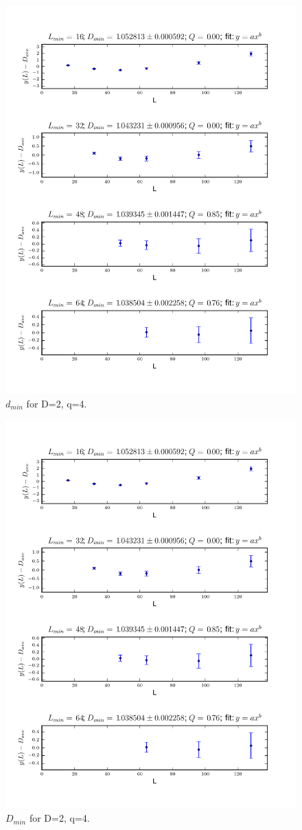\documentclass[pre,preprint]{revtex4}
\begin{document}

\begin{figure}[htp]
\centering
\includegraphics[width=.85\textwidth]{figures/d_min_D2q4_46_fig}
\caption{$d_{min}$ for D=2, q=4.}\label{fig:4}
\end{figure}


\begin{figure}[htp]
\centering
\includegraphics[width=.85\textwidth]{figures/D_min_D2q4_46_fig}
\caption{$D_{min}$ for D=2, q=4.}\label{fig:4}
\end{figure}
\end{document}
